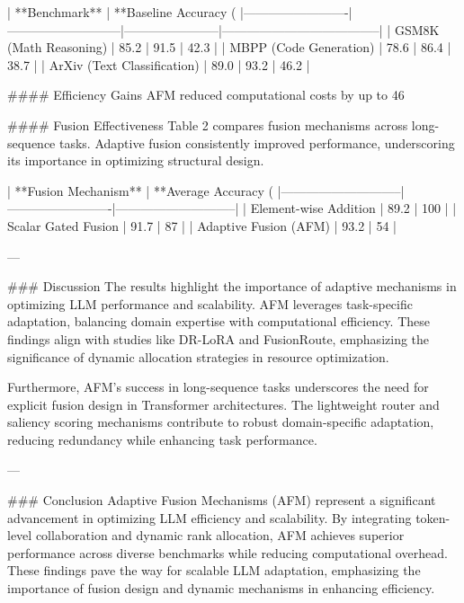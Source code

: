 | **Benchmark**          | **Baseline Accuracy (%
|-------------------------|---------------------------|-----------------------|--------------------------------------|
| GSM8K (Math Reasoning)  | 85.2                     | 91.5                 | 42.3                                 |
| MBPP (Code Generation)  | 78.6                     | 86.4                 | 38.7                                 |
| ArXiv (Text Classification) | 89.0                 | 93.2                 | 46.2                                 |

#### Efficiency Gains  
AFM reduced computational costs by up to 46%

#### Fusion Effectiveness  
Table 2 compares fusion mechanisms across long-sequence tasks. Adaptive fusion consistently improved performance, underscoring its importance in optimizing structural design.

| **Fusion Mechanism**       | **Average Accuracy (%
|-----------------------------|-------------------------|-----------------------------|
| Element-wise Addition       | 89.2                   | 100                         |
| Scalar Gated Fusion         | 91.7                   | 87                          |
| Adaptive Fusion (AFM)       | 93.2                   | 54                          |

---

### Discussion  
The results highlight the importance of adaptive mechanisms in optimizing LLM performance and scalability. AFM leverages task-specific adaptation, balancing domain expertise with computational efficiency. These findings align with studies like DR-LoRA and FusionRoute, emphasizing the significance of dynamic allocation strategies in resource optimization.

Furthermore, AFM's success in long-sequence tasks underscores the need for explicit fusion design in Transformer architectures. The lightweight router and saliency scoring mechanisms contribute to robust domain-specific adaptation, reducing redundancy while enhancing task performance.

---

### Conclusion  
Adaptive Fusion Mechanisms (AFM) represent a significant advancement in optimizing LLM efficiency and scalability. By integrating token-level collaboration and dynamic rank allocation, AFM achieves superior performance across diverse benchmarks while reducing computational overhead. These findings pave the way for scalable LLM adaptation, emphasizing the importance of fusion design and dynamic mechanisms in enhancing efficiency.

